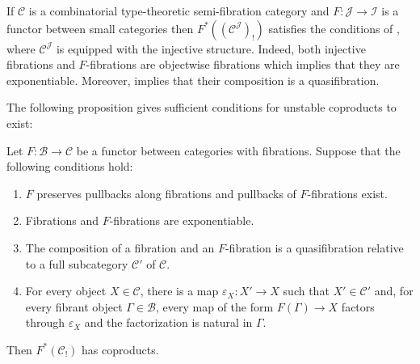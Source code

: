 \documentclass[reqno]{amsart}
\theoremstyle{definition}
\theoremstyle{remark}
\newcommand{\scat}[1]{\mathcal{#1}}
\numberwithin{figure}{section}
\begin{document}
\begin{example}
If $\scat{C}$ is a combinatorial type-theoretic semi-fibration category and $F : \scat{J} \to \scat{I}$ is a functor between small categories
then $F^*((\scat{C}^\scat{J})_!)$ satisfies the conditions of , where $\scat{C}^\scat{J}$ is equipped with the injective structure.
Indeed, both injective fibrations and $F$-fibrations are objectwise fibrations which implies that they are exponentiable.
Moreover,  implies that their composition is a quasifibration.
\end{example}

The following proposition gives sufficient conditions for unstable coproducts to exist:

\begin{prop}
Let $F : \scat{B} \to \scat{C}$ be a functor between categories with fibrations.
Suppose that the following conditions hold:
\begin{enumerate}
\item $F$ preserves pullbacks along fibrations and pullbacks of $F$-fibrations exist.
\item Fibrations and $F$-fibrations are exponentiable.
\item The composition of a fibration and an $F$-fibration is a quasifibration relative to a full subcategory $\scat{C}'$ of $\scat{C}$.
\item For every object $X \in \scat{C}$, there is a map $\varepsilon_X : X' \to X$ such that $X' \in \scat{C}'$ and,
for every fibrant object $\Gamma \in \scat{B}$, every map of the form $F(\Gamma) \to X$ factors through $\varepsilon_X$ and the factorization is natural in $\Gamma$.
\end{enumerate}
Then $F^*(\scat{C}_!)$ has coproducts.
\end{prop}
\end{document}
